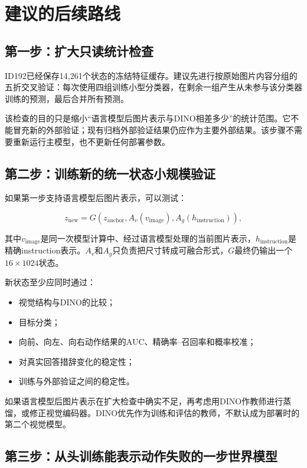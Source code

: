 \documentclass[UTF8,11pt,a4paper,fontset=none]{ctexart}
\begin{document}
\section{建议的后续路线}

\subsection{第一步：扩大只读统计检查}

ID192已经保存14,261个状态的冻结特征缓存。建议先进行按原始图片内容分组的五折交叉验证：每次使用四组训练小型分类器，在剩余一组产生从未参与该分类器训练的预测，最后合并所有预测。

该检查的目的只是缩小“语言模型后图片表示与DINO相差多少”的统计范围。它不能冒充新的外部验证；现有归档外部验证结果仍应作为主要外部结果。该步骤不需要重新运行主模型，也不更新任何部署参数。

\subsection{第二步：训练新的统一状态小规模验证}

如果第一步支持语言模型后图片表示，可以测试：

\begin{equation}
  z_{\mathrm{new}}=
  G\!\left(
    z_{\mathrm{anchor}},
    A_v(v_{\mathrm{image}}),
    A_g(h_{\mathrm{instruction}})
  \right),
\end{equation}

其中$v_{\mathrm{image}}$是同一次模型计算中、经过语言模型处理的当前图片表示，$h_{\mathrm{instruction}}$是精确instruction表示。$A_v$和$A_g$只负责把尺寸转成可融合形式，$G$最终仍输出一个$16\times1024$状态。

新状态至少应同时通过：

\begin{itemize}
  \item 视觉结构与DINO的比较；
  \item 目标分类；
  \item 向前、向左、向右动作结果的AUC、精确率--召回率和概率校准；
  \item 对真实回答措辞变化的稳定性；
  \item 训练与外部验证之间的稳定性。
\end{itemize}

如果语言模型后图片表示在扩大检查中确实不足，再考虑用DINO作教师进行蒸馏，或修正视觉编码器。DINO优先作为训练和评估的教师，不默认成为部署时的第二个视觉模型。

\subsection{第三步：从头训练能表示动作失败的一步世界模型}
\end{document}

